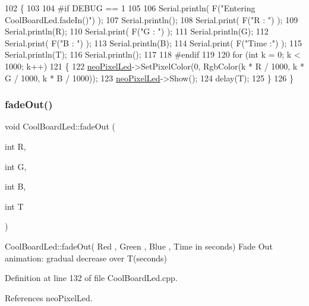 \begin{DoxyCode}
102 \{
103 
104 \textcolor{preprocessor}{#if DEBUG == 1}
105 
106     Serial.println( F(\textcolor{stringliteral}{"Entering CoolBoardLed.fadeIn()"}) );
107     Serial.println();
108     Serial.print( F(\textcolor{stringliteral}{"R : "}) );
109     Serial.println(R);
110     Serial.print( F(\textcolor{stringliteral}{"G : "}) );
111     Serial.println(G);
112     Serial.print( F(\textcolor{stringliteral}{"B : "}) );
113     Serial.println(B);
114     Serial.print( F(\textcolor{stringliteral}{"Time :"}) );
115     Serial.println(T);
116     Serial.println();
117 
118 \textcolor{preprocessor}{#endif  }
119 
120     \textcolor{keywordflow}{for} (\textcolor{keywordtype}{int} k = 0; k < 1000; k++) 
121     \{
122         \hyperlink{classCoolBoardLed_ac2c13fa462a010cd9242bf297c013923}{neoPixelLed}->SetPixelColor(0, RgbColor(k * R / 1000, k * G / 1000, k * B / 1000));
123         \hyperlink{classCoolBoardLed_ac2c13fa462a010cd9242bf297c013923}{neoPixelLed}->Show();
124         delay(T);
125     \}
126 \}
\end{DoxyCode}
\mbox{\label{classCoolBoardLed_a27c4e14fa2cd3639c0844152cea98887}} 
\subsubsection{\texorpdfstring{fade\+Out()}{fadeOut()}}
{\footnotesize\ttfamily void Cool\+Board\+Led\+::fade\+Out (\begin{DoxyParamCaption}\item[{int}]{R,  }\item[{int}]{G,  }\item[{int}]{B,  }\item[{int}]{T }\end{DoxyParamCaption})}

Cool\+Board\+Led\+::fade\+Out( Red , Green , Blue , Time in seconds) Fade Out animation\+: gradual decrease over T(seconds) 

Definition at line 132 of file Cool\+Board\+Led.\+cpp.



References neo\+Pixel\+Led.


